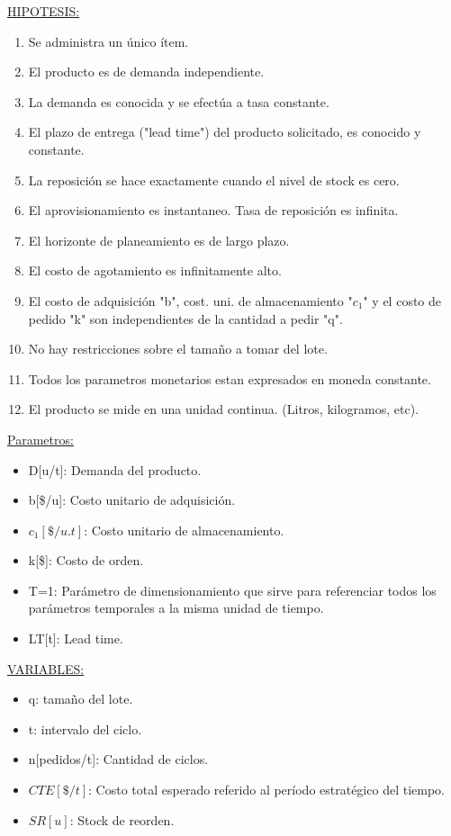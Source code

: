 \documentclass{article}
\begin{document}
\noindent
\underline{HIPOTESIS:}
\begin{enumerate}
    \item Se administra un único ítem.
    \item El producto es de demanda independiente.
    \item La demanda es conocida y se efectúa a tasa constante.
    \item El plazo de entrega ("lead time") del producto solicitado, es conocido y constante.
    \item La reposición se hace exactamente cuando el nivel de stock es cero.
    \item El aprovisionamiento es instantaneo. Tasa de reposición es infinita.
    \item El horizonte de planeamiento es de largo plazo.
    \item El costo de agotamiento es infinitamente alto.
    \item El costo de adquisición "b", cost. uni. de almacenamiento "\(c_1\)" y el costo de pedido "k" son independientes de la cantidad a pedir "q".
    \item No hay restricciones sobre el tamaño a tomar del lote.
    \item Todos los parametros monetarios estan expresados en moneda constante.
    \item El producto se mide en una unidad continua. (Litros, kilogramos, etc).
\end{enumerate}

\noindent
\underline{Parametros:}
\begin{itemize}
    \item D[u/t]: Demanda del producto.
    \item b[\$/u]: Costo unitario de adquisición.
    \item \(c_1[\$/u.t]\):  Costo unitario de almacenamiento.
    \item k[\$]: Costo de orden.
    \item T=1: Parámetro de dimensionamiento que sirve para referenciar todos los parámetros temporales a la misma unidad de tiempo.
    \item LT[t]: Lead time.
\end{itemize}

\noindent
\underline{VARIABLES:}
\begin{itemize}
    \item q: tamaño del lote.
    \item t: intervalo del ciclo.
    \item n[pedidos/t]: Cantidad de ciclos.
    \item \(CTE[\$/t]\): Costo total esperado referido al período estratégico del tiempo.
    \item \(SR[u]\): Stock de reorden.
\end{itemize}
\end{document}
